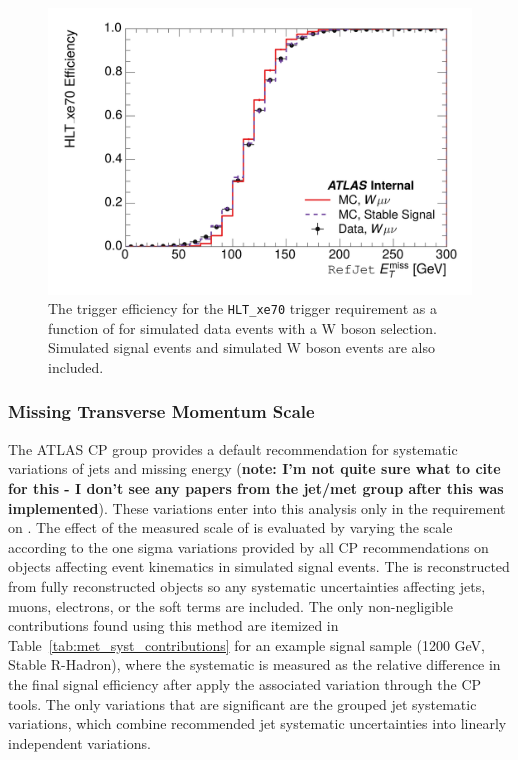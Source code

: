 \begin{figure}[h]
\centering
\includegraphics[width=\fullfig]{figures/hlt_xe70_calomet.png}
\caption{The trigger efficiency for the \texttt{HLT\_xe70} trigger requirement as a function of \calomet for simulated data events with a W boson selection. Simulated signal events and simulated W boson events are also included.}
\label{fig:trigger_turnon_calo}
\end{figure}

\subsubsection{Missing Transverse Momentum Scale}

The \ac{ATLAS} \ac{CP} group provides a default recommendation for systematic variations of jets and missing energy (\textbf{note: I'm not quite sure what to cite for this - I don't see any papers from the jet/met group after this was implemented}). These variations enter into this analysis only in the requirement on \met. The effect of the measured scale of \met is evaluated by varying the \met scale according to the one sigma variations provided by all \ac{CP} recommendations on objects affecting event kinematics in simulated signal events. The \met is reconstructed from fully reconstructed objects so any systematic uncertainties affecting jets, muons, electrons, or the \met soft terms are included. The only non-negligible contributions found using this method are itemized in Table~\ref{tab:met_syst_contributions} for an example signal sample (1200 GeV, Stable R-Hadron), where the systematic is measured as the relative difference in the final signal efficiency after apply the associated variation through the CP tools. The only variations that are significant are the grouped jet systematic variations, which combine recommended jet systematic uncertainties into linearly independent variations. 

